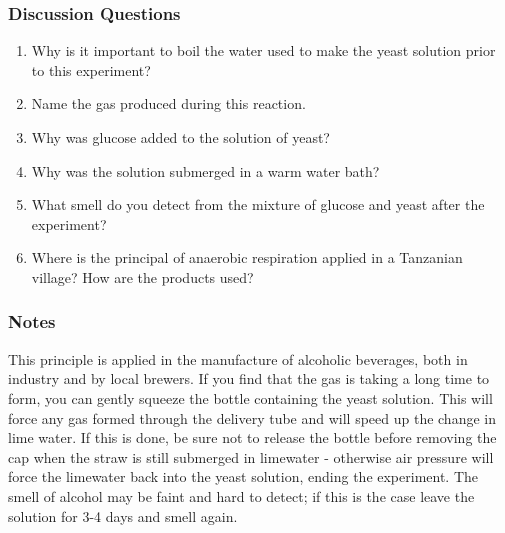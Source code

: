 \subsubsection*{Discussion Questions}
\begin{enumerate}
\item{Why is it important to boil the water used to make the yeast solution prior to this experiment?}
\item{Name the gas produced during this reaction.}
\item{Why was glucose added to the solution of yeast?}
\item{Why was the solution submerged in a warm water bath?}
\item{What smell do you detect from the mixture of glucose and yeast after the experiment?}
\item{Where is the principal of anaerobic respiration applied in a Tanzanian village? How are the products used?}
\end{enumerate}

\subsubsection*{Notes}
This principle is applied in the manufacture of alcoholic beverages, both in industry and by local brewers.
If you find that the gas is taking a long time to form, you can gently squeeze the bottle containing the yeast solution. This will force any gas formed through the delivery tube and will speed up the change in lime water. If this is done, be sure not to release the bottle before removing the cap when the straw is still submerged in limewater - otherwise air pressure will force the limewater back into the yeast solution, ending the experiment.
The smell of alcohol may be faint and hard to detect; if this is the case leave the solution for 3-4 days and smell again.
